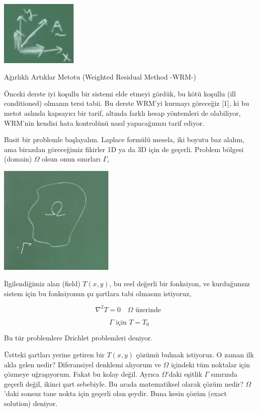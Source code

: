 \documentclass[12pt,fleqn]{article}\usepackage{../../common}
\begin{document}
\includegraphics[width=10em]{compscieng_app45aerofem1_03.png}


Ağırlıklı Artıklar Metotu (Weighted Residual Method -WRM-)

Önceki derste iyi koşullu bir sistemi elde etmeyi gördük, bu kötü koşullu (ill
conditioned) olmanın tersi tabii. Bu derste WRM'yi kurmayı göreceğiz [1], ki bu
metot aslında kapsayıcı bir tarif, altında farklı hesap yöntemleri de
olabiliyor, WRM'nin kendisi hata kontrolünü nasıl yapacağımızı tarif ediyor.

Basit bir problemle başlayalım. Laplace formülü mesela, iki boyutu baz alalım,
ama birazdan göreceğimiz fikirler 1D ya da 3D için de geçerli. Problem bölgesi
(domain) $\Omega$ olsun onun sınırları $\Gamma$, 

\includegraphics[width=15em]{compscieng_app45aerofem1_01.png}

İlgilendiğimiz alan (field) $T(x,y)$, bu reel değerli bir fonksiyon, ve
kurduğumuz sistem için bu fonksiyonun şu şartlara tabi olmasını istiyoruz,

$$
\nabla^2 T = 0 \quad \Omega \textrm{ üzerinde } 
$$

$$
\Gamma \textrm{ için } T = T_0
$$

Bu tür problemlere Drichlet problemleri deniyor.

Üstteki şartları yerine getiren bir $T(x,y)$ çözümü bulmak istiyoruz. O zaman
ilk akla gelen nedir? Diferansiyel denklemi alıyorum ve $\Omega$ içindeki tüm
noktalar için çözmeye uğraşıyorum. Fakat bu kolay değil. Ayrıca $\Omega$'daki
eşitlik $\Gamma$ sınırında geçerli değil, ikinci şart sebebiyle. Bu arada
matematiksel olarak çözüm nedir? $\Omega$'daki sonsuz tane nokta için geçerli
olan şeydir. Buna kesin çözüm (exact solution) deniyor. 
\end{document}
